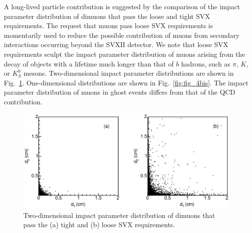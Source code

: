 \documentclass[aps,prd,preprint,floatfix,nofootinbib,superscriptaddress,showpacs,amssymb]{revtex4}
\begin{document}
 A long-lived particle contribution is suggested by the comparison of
 the impact parameter distribution of dimuons that pass the loose and
 tight SVX requirements. The request that muons pass loose SVX
 requirements is momentarily used to reduce the possible contribution
 of muons  from secondary interactions occurring beyond the SVXII detector.
 We note that loose SVX requirements sculpt the impact parameter
 distribution of muons arising from the decay of objects with a lifetime
 much longer than that of $b$ hadrons, such as $\pi$, $K$, or $K^0_S$ mesons.
 Two-dimensional impact parameter distributions are shown in
 Fig.~\ref{fig:fig_3}. One-dimensional distributions are shown in 
 Fig.~\ref{fig:fig_4bis}. The impact parameter distribution of muons
 in ghost events  differs from that of the QCD contribution.
 \begin{figure}[]
 \begin{center}
 \vspace{-0.2in}
 \leavevmode
 \includegraphics*[width=\textwidth]{fa0_3.eps}
 \caption[]{Two-dimensional impact parameter distribution of dimuons
            that pass the (a) tight and (b) loose SVX requirements.}
 \label{fig:fig_3}
 \end{center}
 \end{figure}
\end{document}

